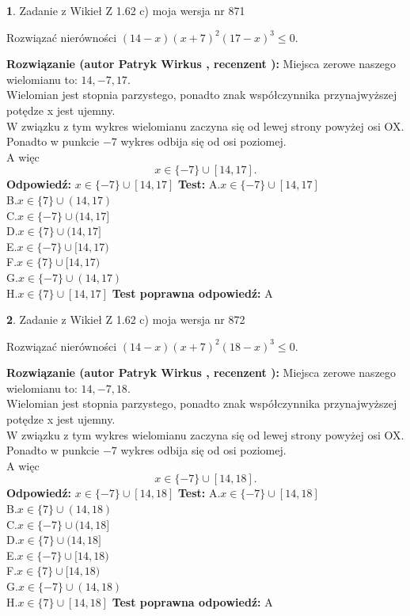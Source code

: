 \documentclass[12pt, a4paper]{article}
\theoremstyle{definition} %
\newtheorem{zad}{}
\newcommand{\zadStart}[1]{\begin{zad}#1\newline}
\newcommand{\zadStop}{\end{zad}}
\newcommand{\rozwStart}[2]{\noindent \textbf{Rozwiązanie (autor #1 , recenzent #2): }\newline}
\newcommand{\rozwStop}{\newline}
\newcommand{\odpStart}{\noindent \textbf{Odpowiedź:}\newline}
\newcommand{\odpStop}{\newline}
\newcommand{\testStart}{\noindent \textbf{Test:}\newline}
\newcommand{\testStop}{\newline}
\newcommand{\kluczStart}{\noindent \textbf{Test poprawna odpowiedź:}\newline}
\newcommand{\kluczStop}{\newline}
\begin{document}
\zadStart{Zadanie z Wikieł Z 1.62 c) moja wersja nr 871}

Rozwiązać nierówności $(14-x)(x+7)^{2}(17-x)^{3}\le0$.
\zadStop
\rozwStart{Patryk Wirkus}{}
Miejsca zerowe naszego wielomianu to: $14, -7, 17$.\\
Wielomian jest stopnia parzystego, ponadto znak współczynnika przy\linebreak najwyższej potędze x jest ujemny.\\ W związku z tym wykres wielomianu zaczyna się od lewej strony powyżej osi OX.\\
Ponadto w punkcie $-7$ wykres odbija się od osi poziomej.\\
A więc $$x \in \{-7\} \cup [14,17].$$
\rozwStop
\odpStart
$x \in \{-7\} \cup [14,17]$
\odpStop
\testStart
A.$x \in \{-7\} \cup [14,17]$\\
B.$x \in \{7\} \cup (14,17)$\\
C.$x \in \{-7\} \cup (14,17]$\\
D.$x \in \{7\} \cup (14,17]$\\
E.$x \in \{-7\} \cup [14,17)$\\
F.$x \in \{7\} \cup [14,17)$\\
G.$x \in \{-7\} \cup (14,17)$\\
H.$x \in \{7\} \cup [14,17]$
\testStop
\kluczStart
A
\kluczStop



\zadStart{Zadanie z Wikieł Z 1.62 c) moja wersja nr 872}

Rozwiązać nierówności $(14-x)(x+7)^{2}(18-x)^{3}\le0$.
\zadStop
\rozwStart{Patryk Wirkus}{}
Miejsca zerowe naszego wielomianu to: $14, -7, 18$.\\
Wielomian jest stopnia parzystego, ponadto znak współczynnika przy\linebreak najwyższej potędze x jest ujemny.\\ W związku z tym wykres wielomianu zaczyna się od lewej strony powyżej osi OX.\\
Ponadto w punkcie $-7$ wykres odbija się od osi poziomej.\\
A więc $$x \in \{-7\} \cup [14,18].$$
\rozwStop
\odpStart
$x \in \{-7\} \cup [14,18]$
\odpStop
\testStart
A.$x \in \{-7\} \cup [14,18]$\\
B.$x \in \{7\} \cup (14,18)$\\
C.$x \in \{-7\} \cup (14,18]$\\
D.$x \in \{7\} \cup (14,18]$\\
E.$x \in \{-7\} \cup [14,18)$\\
F.$x \in \{7\} \cup [14,18)$\\
G.$x \in \{-7\} \cup (14,18)$\\
H.$x \in \{7\} \cup [14,18]$
\testStop
\kluczStart
A
\kluczStop
\end{document}
